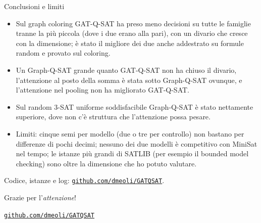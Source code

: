 \documentclass[aspectratio=169]{beamer}
\newcommand{\T}[2]{#2}
\newcommand{\T}[2]{#1}
\begin{document}
\begin{frame}{\T{Conclusions and limits}{Conclusioni e limiti}}
  \begin{itemize}
    \item \T{On graph coloring GAT-Q-SAT took fewer decisions on all the families but the
          smallest (where the two were level), with a gap
          that grows with the size; it was also the better of the two when trained on random
          formulas and tested on coloring.}%
          {Sul graph coloring GAT-Q-SAT ha preso meno decisioni su tutte le famiglie tranne la
          pi\`u piccola (dove i due erano alla pari), con un
          divario che cresce con la dimensione; \`e stato il migliore dei due anche addestrato
          su formule random e provato sul coloring.}
    \item \T{A Graph-Q-SAT as large as GAT-Q-SAT did not close the gap, attention in place
          of the sum was below Graph-Q-SAT everywhere, and attention in the pooling did not
          improve GAT-Q-SAT.}%
          {Un Graph-Q-SAT grande quanto GAT-Q-SAT non ha chiuso il divario, l'attenzione al
          posto della somma \`e stata sotto Graph-Q-SAT ovunque, e l'attenzione nel pooling non
          ha migliorato GAT-Q-SAT.}
    \item \T{On satisfiable uniform random 3-SAT Graph-Q-SAT was clearly superior, where there
          is no structure for the attention to weight.}%
          {Sul random 3-SAT uniforme soddisfacibile Graph-Q-SAT \`e stato nettamente superiore,
          dove non c'\`e struttura che l'attenzione possa pesare.}
    \item \T{Limits: five seeds per model (two or three per control) do not resolve differences of a
          few tenths; neither model is competitive with MiniSat in time; the largest SATLIB
          instances (e.g., bounded model checking) are beyond the size I could evaluate.}%
          {Limiti: cinque semi per modello (due o tre per controllo) non bastano per differenze di pochi
          decimi; nessuno dei due modelli \`e competitivo con MiniSat nel tempo; le istanze pi\`u
          grandi di SATLIB (per esempio il bounded model checking) sono oltre la dimensione che
          ho potuto valutare.}
  \end{itemize}
  \vfill
  {\scriptsize \T{Code, instances and logs:}{Codice, istanze e log:}
  \href{https://github.com/dmeoli/GATQSAT}{\texttt{github.com/dmeoli/GATQSAT}}.}
\end{frame}

\begin{frame}[standout]
  \T{Thank you for your \emph{attention}!}{Grazie per l'\emph{attenzione}!}
  \par{}
  {\mdseries
   \href{https://github.com/dmeoli/GATQSAT}{\textcolor{lamalunga-on-primary}{\texttt{github.com/dmeoli/GATQSAT}}}}
\end{frame}
\end{document}
